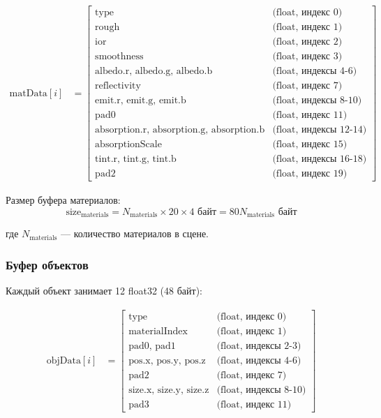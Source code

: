 \documentclass[14pt, a4paper]{extarticle}
\begin{document}
\begin{align}
\text{matData}[i] &= \begin{bmatrix}
\text{type} & \text{(float, индекс 0)} \\
\text{rough} & \text{(float, индекс 1)} \\
\text{ior} & \text{(float, индекс 2)} \\
\text{smoothness} & \text{(float, индекс 3)} \\
\text{albedo.r, albedo.g, albedo.b} & \text{(float, индексы 4-6)} \\
\text{reflectivity} & \text{(float, индекс 7)} \\
\text{emit.r, emit.g, emit.b} & \text{(float, индексы 8-10)} \\
\text{pad0} & \text{(float, индекс 11)} \\
\text{absorption.r, absorption.g, absorption.b} & \text{(float, индексы 12-14)} \\
\text{absorptionScale} & \text{(float, индекс 15)} \\
\text{tint.r, tint.g, tint.b} & \text{(float, индексы 16-18)} \\
\text{pad2} & \text{(float, индекс 19)}
\end{bmatrix}
\end{align}

Размер буфера материалов:
\[
\text{size}_{\text{materials}} = N_{\text{materials}} \times 20 \times 4 \text{ байт} = 80N_{\text{materials}} \text{ байт}
\]

где $N_{\text{materials}}$ --- количество материалов в сцене.

\subsubsection{Буфер объектов}

Каждый объект занимает 12 float32 (48 байт):

\begin{align}
\text{objData}[i] &= \begin{bmatrix}
\text{type} & \text{(float, индекс 0)} \\
\text{materialIndex} & \text{(float, индекс 1)} \\
\text{pad0, pad1} & \text{(float, индексы 2-3)} \\
\text{pos.x, pos.y, pos.z} & \text{(float, индексы 4-6)} \\
\text{pad2} & \text{(float, индекс 7)} \\
\text{size.x, size.y, size.z} & \text{(float, индексы 8-10)} \\
\text{pad3} & \text{(float, индекс 11)}
\end{bmatrix}
\end{align}
\end{document}
